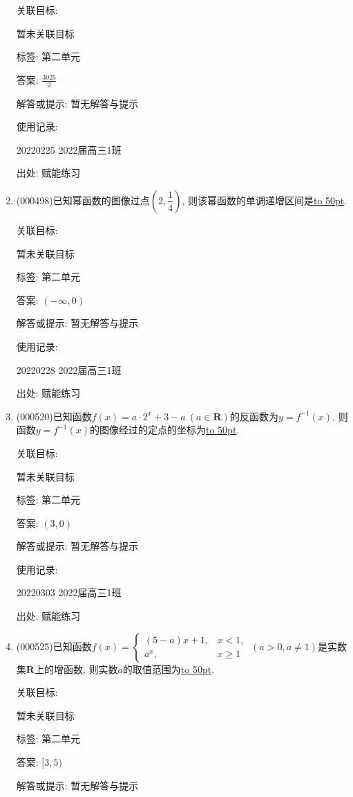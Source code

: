 \documentclass[10pt,a4paper]{article}
\newcommand{\blank}[1]{\underline{\hbox to #1pt{}}}
\begin{document}
\begin{enumerate}[1.]
关联目标:

暂未关联目标



标签: 第二单元

答案: $\frac{3025}2$

解答或提示: 暂无解答与提示

使用记录:

20220225	2022届高三1班	


出处: 赋能练习
\item { (000498)}已知幂函数的图像过点$(2,\dfrac14)$, 则该幂函数的单调递增区间是\blank{50}.


关联目标:

暂未关联目标



标签: 第二单元

答案: $(-\infty ,0)$

解答或提示: 暂无解答与提示

使用记录:

20220228	2022届高三1班	


出处: 赋能练习
\item { (000520)}已知函数$f(x)=a\cdot 2^x+3-a\ (a\in \mathbf{R})$的反函数为$y=f^{-1}(x)$, 则函数$y=f^{-1}(x)$的图像经过的定点的坐标为\blank{50}.


关联目标:

暂未关联目标



标签: 第二单元

答案: $(3,0)$

解答或提示: 暂无解答与提示

使用记录:

20220303	2022届高三1班	


出处: 赋能练习
\item { (000525)}已知函数$f(x)=\begin{cases} (5-a)x+1, & x<1, \\ a^x, & x\ge 1\end{cases} \ (a>0,a\ne 1)$是实数集$\mathbf{R}$上的增函数, 则实数$a$的取值范围为\blank{50}.


关联目标:

暂未关联目标



标签: 第二单元

答案: $[3,5)$

解答或提示: 暂无解答与提示


\end{enumerate}
\end{document}
